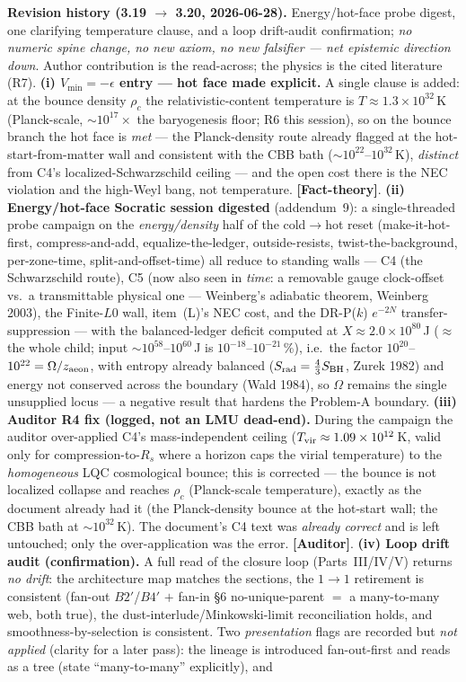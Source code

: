 \documentclass[11pt]{article}
\newcommand{\Auditor}{\textbf{\textcolor{teal!55!black}{[Auditor]}}}
\newcommand{\factth}{\textcolor{green!40!black}{\textbf{[Fact-theory]}}}
\begin{document}
{\smallskip\noindent\textbf{Revision history (3.19 $\to$ 3.20, 2026-06-28).} Energy/hot-face probe digest, one clarifying temperature clause, and a loop drift-audit confirmation; \emph{no numeric spine change, no new axiom, no new falsifier --- net epistemic direction down}. Author contribution is the read-across; the physics is the cited literature (R7). \textbf{(i) $V_{\min}=-\epsilon$ entry --- hot face made explicit.} A single clause is added: at the bounce density $\rho_c$ the relativistic-content temperature is $T\approx1.3\times10^{32}$\,K (Planck-scale, $\sim10^{17}\times$ the baryogenesis floor; R6 this session), so on the bounce branch the hot face is \emph{met} --- the Planck-density route already flagged at the hot-start-from-matter wall and consistent with the CBB bath ($\sim10^{22}$--$10^{32}$\,K), \emph{distinct} from C4's localized-Schwarzschild ceiling --- and the open cost there is the NEC violation and the high-Weyl bang, not temperature. \factth. \textbf{(ii) Energy/hot-face Socratic session digested} (addendum~9): a single-threaded probe campaign on the \emph{energy/density} half of the cold$\to$hot reset (make-it-hot-first, compress-and-add, equalize-the-ledger, outside-resists, twist-the-background, per-zone-time, split-and-offset-time) all reduce to standing walls --- C4 (the Schwarzschild route), C5 (now also seen in \emph{time}: a removable gauge clock-offset vs.\ a transmittable physical one --- Weinberg's adiabatic theorem, Weinberg 2003), the Finite-$L0$ wall, item~(L)'s NEC cost, and the DR-P($k$) $e^{-2N}$ transfer-suppression --- with the balanced-ledger deficit computed at $X\approx2.0\times10^{80}$\,J ($\approx$ the whole child; input $\sim10^{58}$--$10^{60}$\,J is $10^{-18}$--$10^{-21}$\,\%), i.e.\ the factor $10^{20}$--$10^{22}=\Omega/z_{\rm aeon}$, with entropy already balanced ($S_{\rm rad}=\tfrac43 S_{\rm BH}$, Zurek 1982) and energy not conserved across the boundary (Wald 1984), so $\Omega$ remains the single unsupplied locus --- a negative result that hardens the Problem-A boundary. \textbf{(iii) Auditor R4 fix (logged, not an LMU dead-end).} During the campaign the auditor over-applied C4's mass-independent ceiling ($T_{\rm vir}\approx1.09\times10^{12}$\,K, valid only for compression-to-$R_s$ where a horizon caps the virial temperature) to the \emph{homogeneous} LQC cosmological bounce; this is corrected --- the bounce is not localized collapse and reaches $\rho_c$ (Planck-scale temperature), exactly as the document already had it (the Planck-density bounce at the hot-start wall; the CBB bath at $\sim10^{32}$\,K). The document's C4 text was \emph{already correct} and is left untouched; only the over-application was the error. \Auditor. \textbf{(iv) Loop drift audit (confirmation).} A full read of the closure loop (Parts~III/IV/V) returns \emph{no drift}: the architecture map matches the sections, the $1\to1$ retirement is consistent (fan-out $B2'$/$B4'$ $+$ fan-in \S6 no-unique-parent $=$ a many-to-many web, both true), the dust-interlude/Minkowski-limit reconciliation holds, and smoothness-by-selection is consistent. Two \emph{presentation} flags are recorded but \emph{not applied} (clarity for a later pass): the lineage is introduced fan-out-first and reads as a tree (state ``many-to-many'' explicitly), and }
\end{document}
